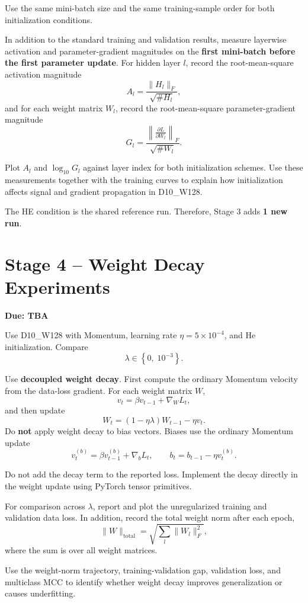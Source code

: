 \documentclass[11pt]{article}
\newcommand{\stagefourdue}{TBA}
\begin{document}
Use the same mini-batch size and the same training-sample order for both initialization conditions.

In addition to the standard training and validation results, measure layerwise activation and parameter-gradient magnitudes on the \textbf{first mini-batch before the first parameter update}. For hidden layer $l$, record the root-mean-square activation magnitude
\[
A_l = \frac{\lVert H_l\rVert_F}{\sqrt{\#H_l}},
\]
and for each weight matrix $W_l$, record the root-mean-square parameter-gradient magnitude
\[
G_l = \frac{\left\lVert \frac{\partial L}{\partial W_l}\right\rVert_F}{\sqrt{\#W_l}}.
\]

Plot $A_l$ and $\log_{10}G_l$ against layer index for both initialization schemes. Use these measurements together with the training curves to explain how initialization affects signal and gradient propagation in D10\_W128.

The HE condition is the shared reference run. Therefore, Stage 3 adds \textbf{1 new run}.

\section{Stage 4 -- Weight Decay Experiments}
\textbf{Due: \stagefourdue}

Use D10\_W128 with Momentum, learning rate $\eta=5\times10^{-4}$, and He initialization. Compare
\[
\lambda \in \left\{0,\;10^{-3}\right\}.
\]

Use \textbf{decoupled weight decay}. First compute the ordinary Momentum velocity from the data-loss gradient. For each weight matrix $W$,
\[
v_t=\beta v_{t-1}+\nabla_W L_t,
\]
and then update
\[
W_t=(1-\eta\lambda)W_{t-1}-\eta v_t.
\]
Do \textbf{not} apply weight decay to bias vectors. Biases use the ordinary Momentum update
\[
v^{(b)}_t=\beta v^{(b)}_{t-1}+\nabla_b L_t,
\qquad
b_t=b_{t-1}-\eta v^{(b)}_t.
\]

Do not add the decay term to the reported loss. Implement the decay directly in the weight update using PyTorch tensor primitives.

For comparison across $\lambda$, report and plot the unregularized training and validation data loss. In addition, record the total weight norm after each epoch,
\[
\lVert W\rVert_{\mathrm{total}}
= \sqrt{\sum_l \lVert W_l\rVert_F^2},
\]
where the sum is over all weight matrices.

Use the weight-norm trajectory, training-validation gap, validation loss, and multiclass MCC to identify whether weight decay improves generalization or causes underfitting.
\end{document}
